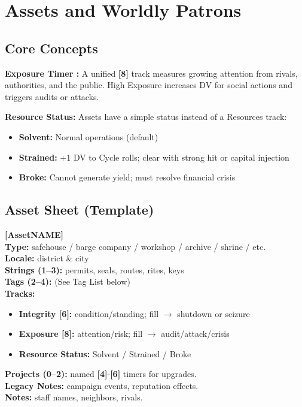 \documentclass[10pt]{article}
\newcommand{\asset}{\textbf{Asset}}
\newcommand{\timer}[1]{\textbf{[#1]}}
\begin{document}

\section{Assets and Worldly Patrons}

\subsection{Core Concepts}

\textbf{Exposure Timer :} A unified \exposure \timer{8} track measures growing attention from rivals, authorities, and the public. High Exposure increases DV for social actions and triggers audits or attacks.

\textbf{Resource Status:} Assets have a simple status instead of a Resources track:
\begin{itemize}[noitemsep]
\item \textbf{Solvent:} Normal operations (default)
\item \textbf{Strained:} +1 DV to Cycle rolls; clear with strong hit or capital injection
\item \textbf{Broke:} Cannot generate yield; must resolve financial crisis
\end{itemize}

\subsection{Asset Sheet (Template)}

\textbf{[\asset NAME]} \\
\textbf{Type:} safehouse / barge company / workshop / archive / shrine / etc. \\
\textbf{Locale:} district \& city \\
\textbf{Strings (1--3):} permits, seals, routes, rites, keys \\
\textbf{Tags (2--4):} (See Tag List below) \\
\textbf{Tracks:}
\begin{itemize}[noitemsep]
\item \textbf{Integrity \timer{6}:} condition/standing; fill $\rightarrow$ shutdown or seizure
\item \textbf{Exposure \timer{8}:} attention/risk; fill $\rightarrow$ audit/attack/crisis
\item \textbf{Resource Status:} Solvent / Strained / Broke
\end{itemize}
\textbf{Projects (0--2):} named \timer{4}-\timer{6} timers for upgrades. \\
\textbf{Legacy Notes:} campaign events, reputation effects. \\
\textbf{Notes:} staff names, neighbors, rivals.
\end{document}
